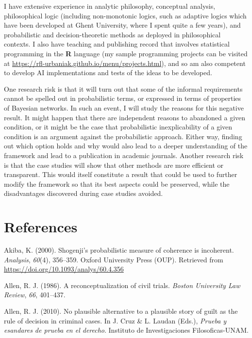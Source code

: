 \documentclass[11pt,dvipsnames,enabledeprecatedfontcommands]{scrartcl}
\begin{document}
I have extensive experience in analytic philosophy, conceptual analysis,
philosophical logic (including non-monotonic logics, such as adaptive
logics which have been developed at Ghent University, where I spent
quite a few years), and probabilistic and decision-theoretic methods as
deployed in philosophical contexts. I also have teaching and publishing
record that involves statistical programming in the \textsf{\textbf{R}}
language (my sample programming projects can be visited at
\url{https://rfl-urbaniak.github.io/menu/projects.html}), and so am also
competent to develop AI implementations and tests of the ideas to be
developed.

One research risk is that it will turn out that some of the informal
requirements cannot be spelled out in probabilistic terms, or expressed
in terms of properties of Bayesian networks. In such an event, I will
study the reasons for this negative result. It might happen that there
are independent reasons to abandoned a given condition, or it might be
the case that probabilistic inexplicability of a given condition is an
argument against the probabilistic approach. Either way, finding out
which option holds and why would also lead to a deeper understanding of
the framework and lead to a publication in academic journals. Another
research risk is that the case studies will show that other methods are
more efficient or transparent. This would itself constitute a result
that could be used to further modify the framework so that its best
aspects could be preserved, while the disadvantages discovered during
case studies avoided.

\hypertarget{references}{%
\section{References}\label{references}}

\footnotesize

\hypertarget{refs}{}
\leavevmode\hypertarget{ref-Akiba2000Shogenjis}{}%
Akiba, K. (2000). Shogenji's probabilistic measure of coherence is
incoherent. \emph{Analysis}, \emph{60}(4), 356--359. Oxford University
Press (OUP). Retrieved from
\url{https://doi.org/10.1093/analys/60.4.356}

\leavevmode\hypertarget{ref-Allen1986A-Reconceptuali}{}%
Allen, R. J. (1986). A reconceptualization of civil trials. \emph{Boston
University Law Review}, \emph{66}, 401--437.

\leavevmode\hypertarget{ref-Allen2010No-Plausible-Al}{}%
Allen, R. J. (2010). No plausible alternative to a plausible story of
guilt as the rule of decision in criminal cases. In J. Cruz \& L. Laudan
(Eds.), \emph{Prueba y esandares de prueba en el derecho}. Instituto de
Investigaciones Filosoficas-UNAM.
\end{document}
